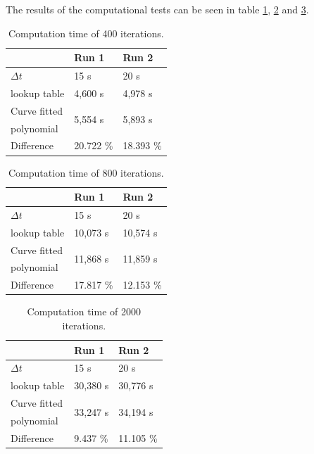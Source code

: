 The results of the computational tests can be seen in table \ref{400_it_comput}, \ref{800_it_comput} and \ref{2000_it_comput}.  

\begin{table}[H]
\centering
\begin{tabular}{|l|l|l|} \hline
	\rowcolor[HTML]{9B9B9B} 
			&  Run 1 & Run 2 \\ \hline
$\Delta t$ &	15 s & 20 s \\ \hline
lookup table &	4,600 s	&	4,978 s \\ \hline
Curve fitted  & \multirow{2}{*}{5,554 s} & \multirow{2}{*}{5,893 s} \\ 
polynomial    &						   &						\\ \hline
Difference    & 20.722 \%			   &  18.393 \% \\ \hline 
\end{tabular}
\caption{Computation time of 400 iterations.}
\label{400_it_comput}
\end{table}

\begin{table}[H]
\centering
\begin{tabular}{|l|l|l|} \hline
	\rowcolor[HTML]{9B9B9B} 
			&  Run 1 & Run 2 \\ \hline
$\Delta t$ 		&	15 s		& 	20 s \\ \hline
lookup table 	&	10,073 s	&	10,574 s \\ \hline
Curve fitted  	& \multirow{2}{*}{11,868 s} & \multirow{2}{*}{11,859 s} \\ 
polynomial    &						   &						\\ \hline
Difference    & 17.817 \%			   &  12.153 \% \\ \hline 
\end{tabular}
\caption{Computation time of 800 iterations.}
\label{800_it_comput}
\end{table}

\begin{table}[H]
\centering
\begin{tabular}{|l|l|l|} \hline
	\rowcolor[HTML]{9B9B9B} 
			&  Run 1 & Run 2 \\ \hline
$\Delta t$ 		&	15 s		& 	20 s \\ \hline
lookup table 	&	30,380 s	&	30,776 s  \\ \hline
Curve fitted 	& \multirow{2}{*}{33,247 s} & \multirow{2}{*}{34,194 s} \\ 
polynomial    	&						   &						\\ \hline
Difference    	& 9.437 \%			   &  11.105 \% \\ \hline 
\end{tabular}
\caption{Computation time of 2000 iterations.}
\label{2000_it_comput}
\end{table}

